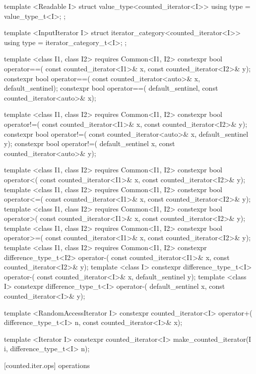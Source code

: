 \begin{codeblock}
{{{{  template <Readable I>
  struct value_type<counted_iterator<I>> {
    using type = value_type_t<I>;
  };

  template <InputIterator I>
  struct iterator_category<counted_iterator<I>> {
    using type = iterator_category_t<I>;
  };

  template <class I1, class I2>
      requires Common<I1, I2>
    constexpr bool operator==(
      const counted_iterator<I1>& x, const counted_iterator<I2>& y);
    constexpr bool operator==(
      const counted_iterator<auto>& x, default_sentinel);
    constexpr bool operator==(
      default_sentinel, const counted_iterator<auto>& x);

  template <class I1, class I2>
      requires Common<I1, I2>
    constexpr bool operator!=(
      const counted_iterator<I1>& x, const counted_iterator<I2>& y);
    constexpr bool operator!=(
      const counted_iterator<auto>& x, default_sentinel y);
    constexpr bool operator!=(
      default_sentinel x, const counted_iterator<auto>& y);

  template <class I1, class I2>
      requires Common<I1, I2>
    constexpr bool operator<(
      const counted_iterator<I1>& x, const counted_iterator<I2>& y);
  template <class I1, class I2>
      requires Common<I1, I2>
    constexpr bool operator<=(
      const counted_iterator<I1>& x, const counted_iterator<I2>& y);
  template <class I1, class I2>
      requires Common<I1, I2>
    constexpr bool operator>(
      const counted_iterator<I1>& x, const counted_iterator<I2>& y);
  template <class I1, class I2>
      requires Common<I1, I2>
    constexpr bool operator>=(
      const counted_iterator<I1>& x, const counted_iterator<I2>& y);
  template <class I1, class I2>
      requires Common<I1, I2>
    constexpr difference_type_t<I2> operator-(
      const counted_iterator<I1>& x, const counted_iterator<I2>& y);
  template <class I>
    constexpr difference_type_t<I> operator-(
      const counted_iterator<I>& x, default_sentinel y);
  template <class I>
    constexpr difference_type_t<I> operator-(
      default_sentinel x, const counted_iterator<I>& y);

  template <RandomAccessIterator I>
    constexpr counted_iterator<I> operator+(
      difference_type_t<I> n, const counted_iterator<I>& x);

  template <Iterator I>
    constexpr counted_iterator<I> make_counted_iterator(I i, difference_type_t<I> n);
}}}}
\end{codeblock}

[counted.iter.ops]{ operations}

